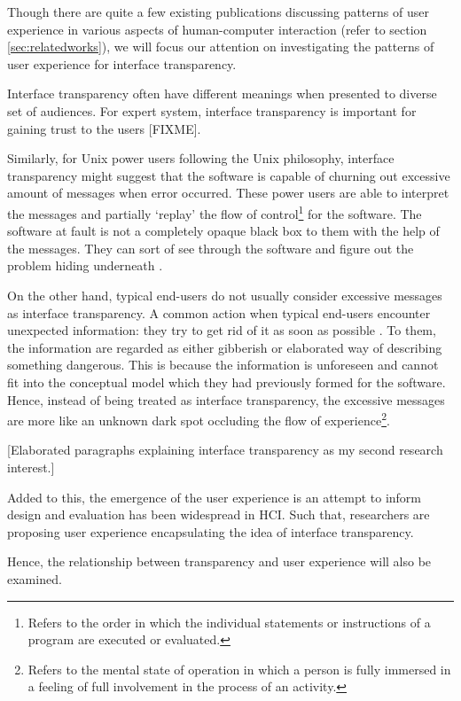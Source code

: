 \documentclass{acm_proc_article-sp}
\begin{document}
Though there are quite a few existing publications discussing patterns
of user experience in various aspects of human-computer interaction
(refer to section \ref{sec:relatedworks}), we will focus our attention
on investigating the patterns of user experience for interface
transparency.

Interface transparency often have different meanings when presented to
diverse set of audiences. For expert system, interface transparency is
important for gaining trust to the users [FIXME].

Similarly, for Unix power users following the Unix philosophy,
interface transparency might suggest that the software is capable of
churning out excessive amount of messages when error occurred. These
power users are able to interpret the messages and partially `replay'
the flow of control\footnote{Refers to the order in which the
  individual statements or instructions of a program are executed or
  evaluated.}  for the software. The software at fault is not a
completely opaque black box to them with the help of the
messages. They can sort of see through the software and figure out the
problem hiding underneath \citep{unix:raymond}.

On the other hand, typical end-users do not usually consider excessive
messages as interface transparency. A common action when typical
end-users encounter unexpected information: they try to get rid of it
as soon as possible \citep{oldnew:chen}. To them, the information are
regarded as either gibberish or elaborated way of describing something
dangerous. This is because the information is unforeseen and cannot
fit into the conceptual model which they had previously formed for the
software. Hence, instead of being treated as interface transparency,
the excessive messages are more like an unknown dark spot occluding
the flow of experience\footnote{Refers to the mental state of
  operation in which a person is fully immersed in a feeling of full
  involvement in the process of an activity.}.


[Elaborated paragraphs explaining interface transparency as my second
  research interest.]

Added to this, the emergence of the user experience is an attempt to
inform design and evaluation has been widespread in HCI. Such that,
researchers are proposing user experience encapsulating the idea of
interface transparency.

Hence, the relationship between transparency and user
experience will also be examined.
\end{document}

